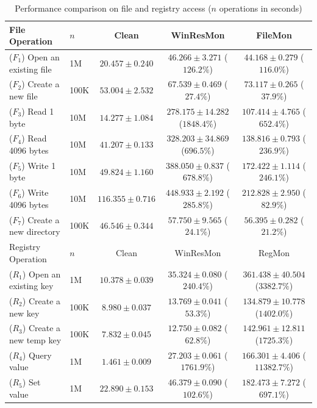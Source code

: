 \begin{table}
\centering
\begin{tabular}{|l|l|c|c|c|}
\hline
File Operation & $n$ & Clean & WinResMon & FileMon \\
\hline
($F_1$) Open an existing file  & 1M   & $20.457 \pm 0.240$  & $46.266 \pm 3.271$ ($126.2\%$)    & $44.168 \pm 0.279$ ($116.0\%$)\\
($F_2$) Create a new file      & 100K & $53.004 \pm 2.532$  & $67.539 \pm 0.469$ ($27.4\%$)     & $73.117 \pm 0.265$ ($37.9\%$) \\
($F_3$) Read 1 byte            & 10M  & $14.277 \pm 1.084$  & $278.175 \pm 14.282$ ($1848.4\%$) & $107.414 \pm 4.765$ ($652.4\%$) \\
($F_4$) Read 4096 bytes        & 10M  & $41.207 \pm 0.133$  & $328.203 \pm 34.869$ ($696.5\%$)  & $138.816 \pm 0.793$ ($236.9\%$) \\
($F_5$) Write 1 byte           & 10M  & $49.824 \pm 1.160$  & $388.050 \pm 0.837$ ($678.8\%$)   & $172.422 \pm 1.114$ ($246.1\%$) \\
($F_6$) Write 4096 bytes       & 10M  & $116.355 \pm 0.716$ & $448.933 \pm 2.192$ ($285.8\%$)   & $212.828 \pm 2.950$ ($82.9\%$) \\
($F_7$) Create a new directory & 100K & $46.546 \pm 0.344$  & $57.750 \pm 9.565$ ($24.1\%$)     & $56.395 \pm 0.282$ ($21.2\%$) \\
\hline
\hline
Registry Operation & $n$ & Clean & WinResMon & RegMon \\
\hline
($R_1$) Open an existing key  & 1M   & $10.378 \pm 0.039$ & $35.324 \pm 0.080$ ($240.4\%$)  & $361.438 \pm 40.504$ ($3382.7\%$) \\
($R_2$) Create a new key      & 100K & $8.980 \pm 0.037$  & $13.769 \pm 0.041$ ($53.3\%$)   & $134.879 \pm 10.778$ ($1402.0\%$) \\
($R_3$) Create a new temp key & 100K & $7.832 \pm 0.045$  & $12.750 \pm 0.082$ ($62.8\%$)   & $142.961 \pm 12.811$ ($1725.3\%$) \\
($R_4$) Query value           & 1M   & $1.461 \pm 0.009$  & $27.203 \pm 0.061$ ($1761.9\%$) & $166.301 \pm 4.406$ ($11382.7\%$) \\
($R_5$) Set value             & 1M   & $22.890 \pm 0.153$ & $46.379 \pm 0.090$ ($102.6\%$)  & $182.473 \pm 7.272$ ($697.1\%$) \\
\hline
\end{tabular}
\caption{Performance comparison on file and registry access ($n$ operations in seconds)}
\label{tab:winresmon-perf-fr}
\end{table}

